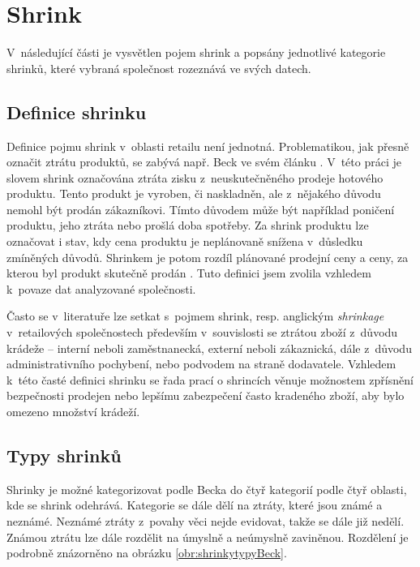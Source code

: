 \section{Shrink}
\label{ch:shrinky}

V~následující části je vysvětlen pojem shrink a popsány jednotlivé kategorie shrinků, které vybraná společnost rozeznává ve svých datech.

\subsection{Definice shrinku}

Definice pojmu shrink v~oblasti retailu není jednotná. Problematikou, jak přesně označit ztrátu produktů, se zabývá např. Beck ve svém článku \cite{bib:shrink2}. V~této práci je slovem shrink označována ztráta zisku z~neuskutečněného prodeje hotového produktu. Tento produkt je vyroben, či naskladněn, ale z~nějakého důvodu nemohl být prodán zákazníkovi. Tímto důvodem může být například poničení produktu, jeho ztráta nebo prošlá doba spotřeby. Za shrink produktu lze označovat i stav, kdy cena produktu je neplánovaně snížena v~důsledku zmíněných důvodů. Shrinkem je potom rozdíl plánované prodejní ceny a ceny, za kterou byl produkt skutečně prodán \cite{bib:DefShrink}. Tuto definici jsem zvolila vzhledem k~povaze dat analyzované společnosti.

Často se v~literatuře lze setkat s~pojmem shrink, resp. anglickým \emph{shrinkage} v~retailových společnostech především v~souvislosti se ztrátou zboží z~důvodu krádeže -- interní neboli zaměstnanecká, externí neboli zákaznická, dále z~důvodu administrativního pochybení, nebo podvodem na straně dodavatele. Vzhledem k~této časté definici shrinku se řada prací o shrincích věnuje možnostem zpřísnění bezpečnosti prodejen nebo lepšímu zabezpečení často kradeného zboží, aby bylo omezeno množství krádeží.\cite{bib:shrink1,bib:shrink2}



\subsection{Typy shrinků}
\label{sec:shrinkyTypy}

Shrinky je možné kategorizovat podle Becka do čtyř kategorií podle čtyř oblasti, kde se shrink odehrává. Kategorie se dále dělí na ztráty, které jsou známé a neznámé. Neznámé ztráty z~povahy věci nejde evidovat, takže se dále již nedělí. Známou ztrátu lze dále rozdělit na úmyslně a neúmyslně zaviněnou. Rozdělení je podrobně znázorněno na obrázku \ref{obr:shrinkytypyBeck}.

